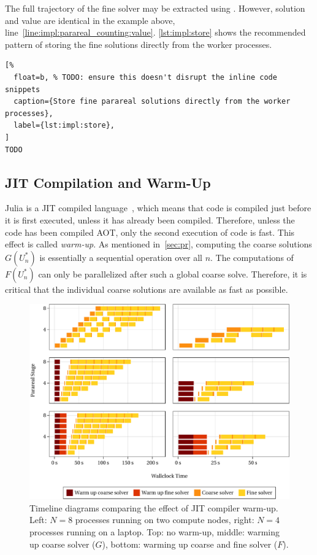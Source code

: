 The full trajectory of the fine solver may be extracted using .
However, solution and value are identical in the example above,
\cf line~\ref{line:impl:parareal_counting:value}.
\autoref{lst:impl:store} shows the recommended pattern of storing the fine solutions directly from the worker processes.

\begin{lstlisting}[%
  float=b, % TODO: ensure this doesn't disrupt the inline code snippets
  caption={Store fine parareal solutions directly from the worker processes},
  label={lst:impl:store},
]
TODO
\end{lstlisting}

\subsection{JIT Compilation and Warm-Up}

Julia is a \ac{JIT} compiled language~\cite{Julia},
which means that code is compiled just before it is first executed,
unless it has already been compiled.
Therefore, unless the code has been compiled \ac{AOT},
only the second execution of code is fast.
This effect is called \emph{warm-up}.
As mentioned in~\autoref{sec:pr}, computing the coarse solutions
$G(U_n^*)$ is essentially a sequential operation over all $n$.
The computations of $F(U^*_n)$ can only be parallelized after such a global coarse solve.
Therefore, it is critical that the individual coarse solutions are available as fast as possible.


\begin{figure}[tb]
  \includegraphics[width=\textwidth]{figures/fig_impl_warmup2.pdf}
  \caption[Timeline diagrams comparing the effect of JIT compiler warm-up.]{%
    Timeline diagrams comparing the effect of \acs{JIT} compiler warm-up.
    Left: $N=8$ processes running on two compute nodes,
    right: $N=4$ processes running on a laptop.
    Top: no warm-up,
    middle: warming up coarse solver  ($G$),
    bottom: warming up coarse and fine solver  ($F$).
  }
  \label{fig:impl:warmup}
\end{figure}

